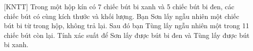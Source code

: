 \begin{bt}%
[KNTT]%
	Trong một hộp kín có 7 chiếc bút bi xanh và 5 chiếc bút bi đen, các chiếc bút có cùng kích thước và khối lượng. Bạn Sơn lấy ngẫu nhiên một chiếc bút bi từ trong hộp, không trả lại. Sau đó bạn Tùng lấy ngẫu nhiên một trong 11 chiếc bút còn lại. Tính xác suất để Sơn lấy được bút bi đen và Tùng lấy được bút bi xanh.
\end{bt}

